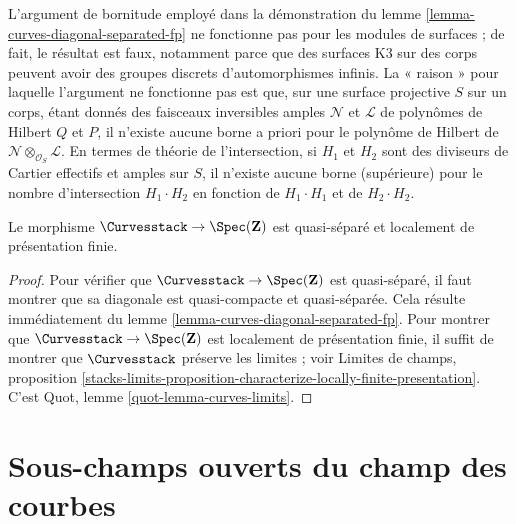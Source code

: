 \begin{remark}
\label{remark-boundedness-aut-does-not-work-surfaces}
L'argument de bornitude employé dans la démonstration du
lemme \ref{lemma-curves-diagonal-separated-fp}
ne fonctionne pas pour les modules de surfaces ; de fait,
le résultat est faux, notamment parce que des surfaces K3
sur des corps peuvent avoir des groupes discrets d'automorphismes infinis.
La « raison » pour laquelle l'argument ne fonctionne pas est que, sur une
surface projective $S$ sur un corps, étant donnés des faisceaux inversibles
amples $\mathcal{N}$ et $\mathcal{L}$ de polynômes de Hilbert $Q$ et $P$,
il n'existe aucune borne a priori pour le polynôme de Hilbert de
$\mathcal{N} \otimes_{\mathcal{O}_S} \mathcal{L}$.
En termes de théorie de l'intersection, si $H_1$ et $H_2$ sont des
diviseurs de Cartier effectifs et amples sur $S$, il n'existe aucune
borne (supérieure) pour le nombre d'intersection $H_1 \cdot H_2$
en fonction de $H_1 \cdot H_1$ et de $H_2 \cdot H_2$.
\end{remark}

\begin{lemma}
\label{lemma-curves-qs-lfp}
Le morphisme $\Curvesstack \to \Spec(\mathbf{Z})$ est quasi-séparé et
localement de présentation finie.
\end{lemma}

\begin{proof}
Pour vérifier que $\Curvesstack \to \Spec(\mathbf{Z})$ est quasi-séparé,
il faut montrer que sa diagonale est quasi-compacte et quasi-séparée.
Cela résulte immédiatement du lemme
\ref{lemma-curves-diagonal-separated-fp}.
Pour montrer que $\Curvesstack \to \Spec(\mathbf{Z})$ est localement de
présentation finie, il suffit de montrer que $\Curvesstack$
préserve les limites ; voir Limites de champs, proposition
\ref{stacks-limits-proposition-characterize-locally-finite-presentation}.
C'est Quot, lemme \ref{quot-lemma-curves-limits}.
\end{proof}






\section{Sous-champs ouverts du champ des courbes}
\label{section-open}

